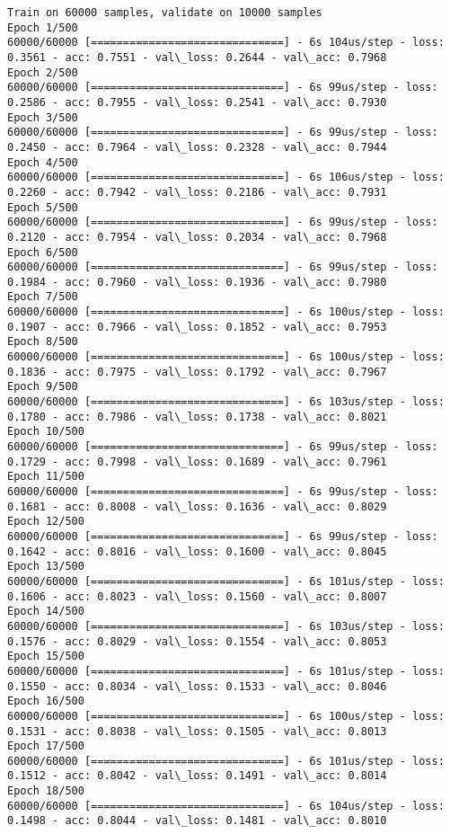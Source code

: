 \documentclass[11pt]{article}
\begin{document}
    \begin{Verbatim}[commandchars=\\\{\}]
Train on 60000 samples, validate on 10000 samples
Epoch 1/500
60000/60000 [==============================] - 6s 104us/step - loss: 0.3561 - acc: 0.7551 - val\_loss: 0.2644 - val\_acc: 0.7968
Epoch 2/500
60000/60000 [==============================] - 6s 99us/step - loss: 0.2586 - acc: 0.7955 - val\_loss: 0.2541 - val\_acc: 0.7930
Epoch 3/500
60000/60000 [==============================] - 6s 99us/step - loss: 0.2450 - acc: 0.7964 - val\_loss: 0.2328 - val\_acc: 0.7944
Epoch 4/500
60000/60000 [==============================] - 6s 106us/step - loss: 0.2260 - acc: 0.7942 - val\_loss: 0.2186 - val\_acc: 0.7931
Epoch 5/500
60000/60000 [==============================] - 6s 99us/step - loss: 0.2120 - acc: 0.7954 - val\_loss: 0.2034 - val\_acc: 0.7968
Epoch 6/500
60000/60000 [==============================] - 6s 99us/step - loss: 0.1984 - acc: 0.7960 - val\_loss: 0.1936 - val\_acc: 0.7980
Epoch 7/500
60000/60000 [==============================] - 6s 100us/step - loss: 0.1907 - acc: 0.7966 - val\_loss: 0.1852 - val\_acc: 0.7953
Epoch 8/500
60000/60000 [==============================] - 6s 100us/step - loss: 0.1836 - acc: 0.7975 - val\_loss: 0.1792 - val\_acc: 0.7967
Epoch 9/500
60000/60000 [==============================] - 6s 103us/step - loss: 0.1780 - acc: 0.7986 - val\_loss: 0.1738 - val\_acc: 0.8021
Epoch 10/500
60000/60000 [==============================] - 6s 99us/step - loss: 0.1729 - acc: 0.7998 - val\_loss: 0.1689 - val\_acc: 0.7961
Epoch 11/500
60000/60000 [==============================] - 6s 99us/step - loss: 0.1681 - acc: 0.8008 - val\_loss: 0.1636 - val\_acc: 0.8029
Epoch 12/500
60000/60000 [==============================] - 6s 99us/step - loss: 0.1642 - acc: 0.8016 - val\_loss: 0.1600 - val\_acc: 0.8045
Epoch 13/500
60000/60000 [==============================] - 6s 101us/step - loss: 0.1606 - acc: 0.8023 - val\_loss: 0.1560 - val\_acc: 0.8007
Epoch 14/500
60000/60000 [==============================] - 6s 103us/step - loss: 0.1576 - acc: 0.8029 - val\_loss: 0.1554 - val\_acc: 0.8053
Epoch 15/500
60000/60000 [==============================] - 6s 101us/step - loss: 0.1550 - acc: 0.8034 - val\_loss: 0.1533 - val\_acc: 0.8046
Epoch 16/500
60000/60000 [==============================] - 6s 100us/step - loss: 0.1531 - acc: 0.8038 - val\_loss: 0.1505 - val\_acc: 0.8013
Epoch 17/500
60000/60000 [==============================] - 6s 101us/step - loss: 0.1512 - acc: 0.8042 - val\_loss: 0.1491 - val\_acc: 0.8014
Epoch 18/500
60000/60000 [==============================] - 6s 104us/step - loss: 0.1498 - acc: 0.8044 - val\_loss: 0.1481 - val\_acc: 0.8010

\end{Verbatim}
\end{document}
